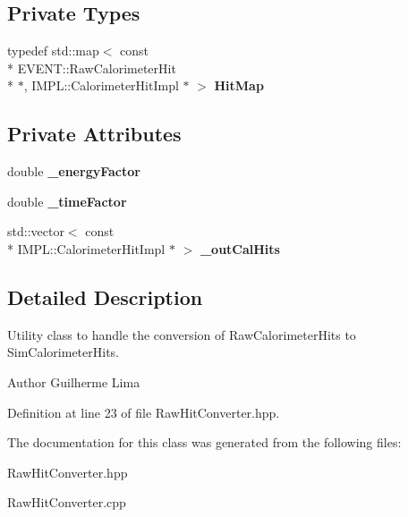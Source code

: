 \subsection*{Private Types}
\begin{DoxyCompactItemize}
\item 
typedef std\-::map$<$ const \\*
E\-V\-E\-N\-T\-::\-Raw\-Calorimeter\-Hit \\*
$\ast$, I\-M\-P\-L\-::\-Calorimeter\-Hit\-Impl $\ast$ $>$ {\bfseries Hit\-Map}\label{classdigisim_1_1RawHitConverter_a758d21158f1bcfeab05338272405378b}

\end{DoxyCompactItemize}
\subsection*{Private Attributes}
\begin{DoxyCompactItemize}
\item 
double {\bfseries \-\_\-energy\-Factor}\label{classdigisim_1_1RawHitConverter_a9a910a84c29119a74a2ad3fe3e0cb137}

\item 
double {\bfseries \-\_\-time\-Factor}\label{classdigisim_1_1RawHitConverter_aee3caecdb0f171d2168bd28d0ca4de20}

\item 
std\-::vector$<$ const \\*
I\-M\-P\-L\-::\-Calorimeter\-Hit\-Impl $\ast$ $>$ {\bfseries \-\_\-out\-Cal\-Hits}\label{classdigisim_1_1RawHitConverter_aa8d3b0a3603e8d6036c2bca684373513}

\end{DoxyCompactItemize}


\subsection{Detailed Description}
Utility class to handle the conversion of Raw\-Calorimeter\-Hits to Sim\-Calorimeter\-Hits. 

\begin{DoxyAuthor}{Author}
Guilherme Lima 
\end{DoxyAuthor}


Definition at line 23 of file Raw\-Hit\-Converter.\-hpp.



The documentation for this class was generated from the following files\-:\begin{DoxyCompactItemize}
\item 
Raw\-Hit\-Converter.\-hpp\item 
Raw\-Hit\-Converter.\-cpp\end{DoxyCompactItemize}
